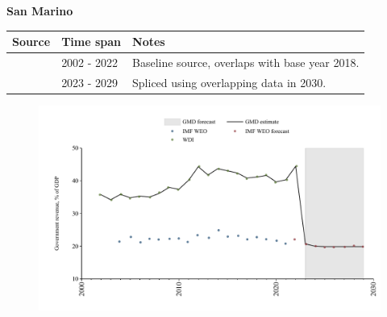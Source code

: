 \documentclass[12pt,a4paper,landscape]{article}
\begin{document}
\begin{adjustbox}{max totalsize={\paperwidth}{\paperheight},center}
\begin{minipage}[t][\textheight][t]{\textwidth}
\vspace*{0.5cm}
{}
\begin{center}
{\Large\bfseries San Marino}
\end{center}
\vspace{0.5cm}
\begin{table}[H]
\centering
\small
\begin{tabular}{|l|l|l|}
\hline
\textbf{Source} & \textbf{Time span} & \textbf{Notes} \\
\hline
\rowcolor{white}\cite{WDI}& 2002 - 2022 &Baseline source, overlaps with base year 2018.\\
\rowcolor{lightgray}\cite{IMF_WEO_forecast}& 2023 - 2029 &Spliced using overlapping data in 2030.\\
\hline
\end{tabular}
\end{table}
\begin{figure}[H]
\centering
\includegraphics[width=\textwidth,height=0.6\textheight,keepaspectratio]{graphs/SMR_govrev_GDP.pdf}
\end{figure}
\end{minipage}
\end{adjustbox}
\end{document}
